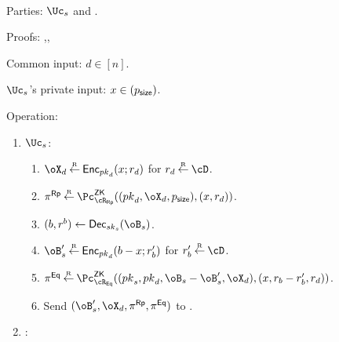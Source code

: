 \begin{protocol}~\label{prot:ConfidentialTransactions:Transfer}
	\item[Parties:] $\Uc_s$ and \Cc.
	
\item[Proofs:]   \piZK{\rRp},\piZK{\rEq},\piZK{\rLrgEq}



	
	\item[Common input:] $d\in [n]$.
	
	\item[$\Uc_s$'s private  input:] $x \in (p_{\mathsf{size}})$.
	
\item[Operation:] ~
	
	\begin{enumerate}
		\item  $\Uc_s$: 
		
		\begin{enumerate}
			\item $\oX_d \getsr \Enc_{\pk_d}(x;r_d)$ for $r_d \getsr \cD$.
			
		
			\item $\pi^\RPs \getsr \pZK{\rRp}((\pk_d,\oX_d,\psize),(x,r_d))$.
			
			
			
			
			\item $(b,r^b) \asn \Dec_{sk_s}(\oB_s)$.
			
			\item $\oB_s' \getsr \Enc_{\pk_d}(b-x;r_b')$ for $r_b' \getsr \cD$.
			
			
		 

			
			
			\item $\pi^\Eqs \getsr \pZK{\rEq}((\pk_s,\pk_d,\oB_s- \oB_s',\oX_d),(x,r_b - r_b',r_d))$.
			
			
		
			
			
			
			\item Send $(\oB_s',\oX_d,\pi^\RPs,\pi^\Eqs)$ to \Cc.
		\end{enumerate}
		
		
		\item  \Cc: 
		

\end{enumerate}
\end{protocol}
